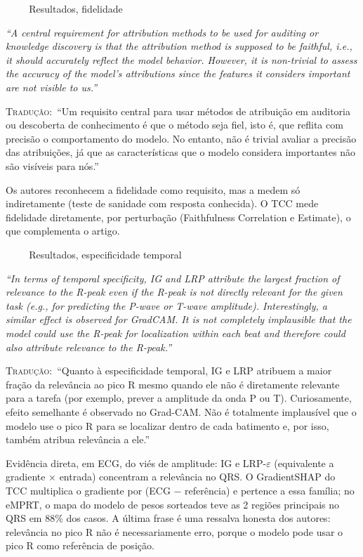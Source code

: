 \documentclass[11pt,a4paper]{article}
\newcommand{\pagechip}[1]{{\setlength{\fboxsep}{1.5pt}\colorbox{cAcc}{\textcolor{white}{\scriptsize\texttt{#1}}}}}
\newenvironment{origquote}{\par\itshape\small}{\par}
\newenvironment{tradquote}{\par\small\textsc{Tradução:}\ }{\par}
\newcommand{\explab}[1]{\par\smallskip{\small\color{cAcc}\textbf{\MakeUppercase{#1}}}\par}
\begin{document}
\begin{citacard}{\pagechip{p. 7} Resultados, fidelidade}
\begin{origquote}“A central requirement for attribution methods to be used for auditing or knowledge discovery is that the attribution method is supposed to be faithful, i.e., it should accurately reflect the model behavior. However, it is non-trivial to assess the accuracy of the model’s attributions since the features it considers important are not visible to us.”\end{origquote}
\begin{tradquote}“Um requisito central para usar métodos de atribuição em auditoria ou descoberta de conhecimento é que o método seja fiel, isto é, que reflita com precisão o comportamento do modelo. No entanto, não é trivial avaliar a precisão das atribuições, já que as características que o modelo considera importantes não são visíveis para nós.”\end{tradquote}
\explab{Explicação}
Os autores reconhecem a fidelidade como requisito, mas a medem só indiretamente (teste de sanidade com resposta conhecida). O TCC mede fidelidade diretamente, por perturbação (Faithfulness Correlation e Estimate), o que complementa o artigo.
\end{citacard}

\begin{citacard}{\pagechip{p. 8} Resultados, especificidade temporal}
\begin{origquote}“In terms of temporal specificity, IG and LRP attribute the largest fraction of relevance to the R-peak even if the R-peak is not directly relevant for the given task (e.g., for predicting the P-wave or T-wave amplitude). Interestingly, a similar effect is observed for GradCAM. It is not completely implausible that the model could use the R-peak for localization within each beat and therefore could also attribute relevance to the R-peak.”\end{origquote}
\begin{tradquote}“Quanto à especificidade temporal, IG e LRP atribuem a maior fração da relevância ao pico R mesmo quando ele não é diretamente relevante para a tarefa (por exemplo, prever a amplitude da onda P ou T). Curiosamente, efeito semelhante é observado no Grad-CAM. Não é totalmente implausível que o modelo use o pico R para se localizar dentro de cada batimento e, por isso, também atribua relevância a ele.”\end{tradquote}
\explab{Explicação}
Evidência direta, em ECG, do viés de amplitude: IG e LRP-$\varepsilon$ (equivalente a gradiente × entrada) concentram a relevância no QRS. O GradientSHAP do TCC multiplica o gradiente por (ECG $-$ referência) e pertence a essa família; no eMPRT, o mapa do modelo de pesos sorteados teve as 2 regiões principais no QRS em 88\% dos casos. A última frase é uma ressalva honesta dos autores: relevância no pico R não é necessariamente erro, porque o modelo pode usar o pico R como referência de posição.
\end{citacard}
\end{document}
